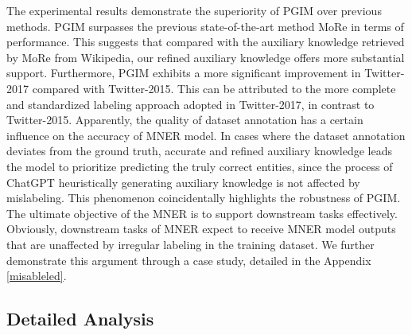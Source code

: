 \documentclass[11pt]{article}
\begin{document}
The experimental results demonstrate the superiority of PGIM over previous methods. PGIM surpasses the previous state-of-the-art method MoRe \citep{wang2022named} in terms of performance. This suggests that compared with the auxiliary knowledge retrieved by MoRe \citep{wang2022named} from Wikipedia, our refined auxiliary knowledge offers more substantial support. Furthermore, PGIM exhibits a more significant improvement in Twitter-2017 compared with Twitter-2015. This can be attributed to the more complete and standardized labeling approach adopted in Twitter-2017, in contrast to Twitter-2015. 
Apparently, the quality of dataset annotation has a certain influence on the accuracy of MNER model. 
In cases where the dataset annotation deviates from the ground truth, 
accurate and refined auxiliary knowledge leads the model to prioritize predicting the truly correct entities, since the process of ChatGPT heuristically generating auxiliary knowledge is not affected by mislabeling. 
This phenomenon coincidentally highlights the robustness of PGIM.  
The ultimate objective of the MNER is to support downstream tasks effectively. Obviously, downstream tasks of MNER expect to receive MNER model outputs that are unaffected by irregular labeling in the training dataset. 
We further demonstrate this argument through a case study, detailed in the Appendix \ref{misableled}.


\subsection{Detailed Analysis}
\end{document}
